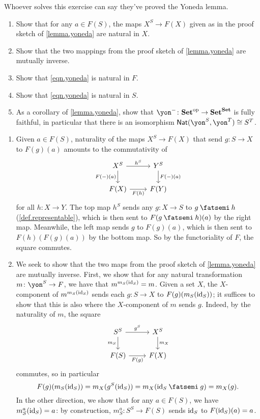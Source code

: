 \documentclass[Book-Poly]{subfiles}
\begin{document}
\begin{exercise}\label{exc.finish_proof_yoneda}
Whoever solves this exercise can say they've proved the Yoneda lemma.
\begin{enumerate}
	\item Show that for any $a\in F(S)$, the maps $X^S\to F(X)$ given as in the proof sketch of \cref{lemma.yoneda} are natural in $X$.
	\item Show that the two mappings from the proof sketch of \cref{lemma.yoneda} are mutually inverse.
	\item Show that \eqref{eqn.yoneda} is natural in $F$.
	\item Show that \eqref{eqn.yoneda} is natural in $S$.
	\item As a corollary of \cref{lemma.yoneda}, show that $\yon^-\colon\smset\op\to\smset^\smset$ is fully faithful, in particular that there is an isomorphism $\nat(\yon^S,\yon^T)\cong S^T$.
\qedhere
\end{enumerate}

\begin{solution}
\begin{enumerate}
    \item Given $a \in F(S)$, naturality of the maps $X^S \to F(X)$ that send $g \colon S \to X$ to $F(g)(a)$ amounts to the commutativity of
    \[
    \begin{tikzcd}[ampersand replacement=\&]
    	X^S\ar[r, "h^S"]\ar[d, "F(-)(a)"']\&
    	Y^S\ar[d, "F(-)(a)"]\\
    	F(X)\ar[r, "F(h)"']\&
    	F(Y)
    \end{tikzcd}
    \]
    for all $h \colon X \to Y$.
    The top map $h^S$ sends any $g \colon X \to S$ to $g \then h$ (\cref{def.representable}), which is then sent to $F(g \then h)(a)$ by the right map.
    Meanwhile, the left map sends $g$ to $F(g)(a)$, which is then sent to $F(h)(F(g)(a))$ by the bottom map.
    So by the functoriality of $F$, the square commutes.
    
    \item We seek to show that the two maps from the proof sketch of \cref{lemma.yoneda} are mutually inverse. First, we show that for any natural transformation $m \colon \yon^S \to F$, we have that $m^{m_S(\mathrm{id}_S)} = m$.
    Given a set $X$, the $X$-component of $m^{m_S(\mathrm{id}_S)}$ sends each $g \colon S \to X$ to $F(g)(m_S(\mathrm{id}_S))$; it suffices to show that this is also where the $X$-component of $m$ sends $g$.
    Indeed, by the naturality of $m$, the square
    \[
    \begin{tikzcd}[ampersand replacement=\&]
    	S^S\ar[r, "g^S"]\ar[d, "m_S"']\&
    	X^S\ar[d, "m_X"]\\
    	F(S)\ar[r, "F(g)"']\&
    	F(X)
    \end{tikzcd}
    \]
    commutes, so in particular
    \begin{equation} \label{eq.finish_proof_yoneda}
        F(g)(m_S(\id_S)) = m_X(g^S(\id_S)) = m_X(\id_S \then g) = m_X(g).
    \end{equation}
    In the other direction, we show that for any $a \in F(S)$, we have $m^a_S(\mathrm{id}_S) = a$: by construction, $m^a_S \colon S^S \to F(S)$ sends $\mathrm{id}_S$ to $F(\mathrm{id}_S)(a) = a$.
    

\end{enumerate}
\end{solution}
\end{exercise}
\end{document}
